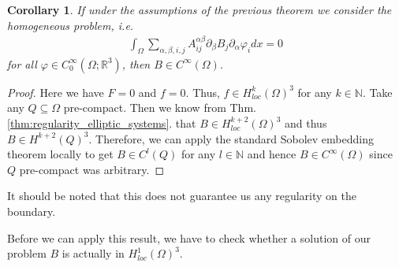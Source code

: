 \documentclass[12pt,a4paper]{article}
\numberwithin{equation}{subsection}
\numberwithin{lemma}{subsection}
\newtheorem{corollary}[lemma]{Corollary}
\theoremstyle{definition}
\newcommand{\naturalnum}{\mathbb{N}}
\newcommand{\real}{\mathbb{R}}
\begin{document}
\begin{corollary}\label{cor:smooth_solution}
    If under the assumptions of the previous theorem we consider the 
    homogeneous problem, i.e.
    \begin{align*}
        \int_\Omega \sum\limits_{\alpha,\beta,i,j} 
        A_{ij}^{\alpha \beta} \partial_\beta B_j \partial_\alpha \varphi_i dx =0
    \end{align*}
    for all $\varphi \in C^\infty_0(\Omega;\real^3)$, then $B\in C^\infty(\Omega)$.
\end{corollary}
\begin{proof}
    Here we have $F= 0$ and $f = 0$. Thus, $f \in H^k_{loc}(\Omega)^3$ 
    for any $k \in \naturalnum$. 
    Take any $Q \subseteq \Omega$ pre-compact. Then we know from 
    Thm.\,\ref{thm:regularity_elliptic_systems}.
    that $B \in H_{loc}^{k+2}(\Omega)^3$ and thus $B \in H^{k+2}(Q)^3$.
    Therefore, we can apply the 
    standard Sobolev embedding theorem locally to get $B \in C^l(Q)$ for any 
    $l \in \naturalnum$ and hence $B \in C^\infty(\Omega)$ since $Q$ pre-compact
    was arbitrary. 
\end{proof}
It should be noted that this does not guarantee us any regularity on the 
boundary. 

Before we can apply this result, we have to check whether a solution of our 
problem $B$ is actually in $H^1_{loc}(\Omega)^3$. 
\end{document}
